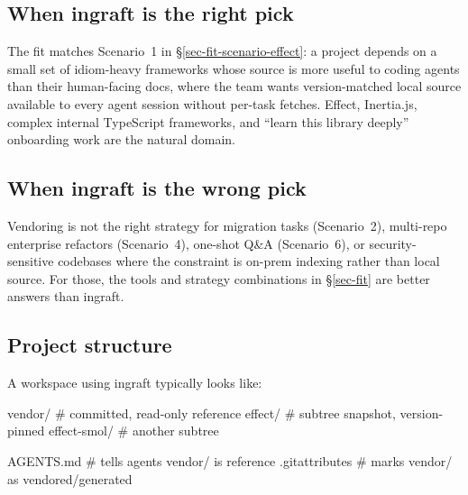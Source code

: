 \documentclass[
  11pt,
  letterpaper,
  numbers=noendperiod,
  parskip=half]{scrartcl}
\newenvironment{Shaded}{}{}
\newcommand{\NormalTok}[1]{\textcolor[rgb]{0.14,0.16,0.18}{#1}}
\begin{document}
\subsection*{When ingraft is the right pick}

The fit matches Scenario~1 in \S\ref{sec-fit-scenario-effect}: a
project depends on a small set of idiom-heavy frameworks whose source
is more useful to coding agents than their human-facing docs, where
the team wants version-matched local source available to every agent
session without per-task fetches. Effect, Inertia.js, complex internal
TypeScript frameworks, and ``learn this library deeply'' onboarding
work are the natural domain.

\subsection*{When ingraft is the wrong pick}

Vendoring is not the right strategy for migration tasks (Scenario~2),
multi-repo enterprise refactors (Scenario~4), one-shot Q\&A
(Scenario~6), or security-sensitive codebases where the constraint is
on-prem indexing rather than local source. For those, the tools and
strategy combinations in \S\ref{sec-fit} are better answers than
ingraft.

\subsection*{Project structure}

A workspace using ingraft typically looks like:

\begin{Shaded}
\begin{Highlighting}[]
\NormalTok{vendor/                         \# committed, read{-}only reference}
\NormalTok{  effect/                        \# subtree snapshot, version{-}pinned}
\NormalTok{  effect{-}smol/                   \# another subtree}

\NormalTok{AGENTS.md                        \# tells agents \textquotesingle vendor/ is reference\textquotesingle}
\NormalTok{.gitattributes                   \# marks vendor/ as vendored/generated}
\end{Highlighting}
\end{Shaded}
\end{document}

